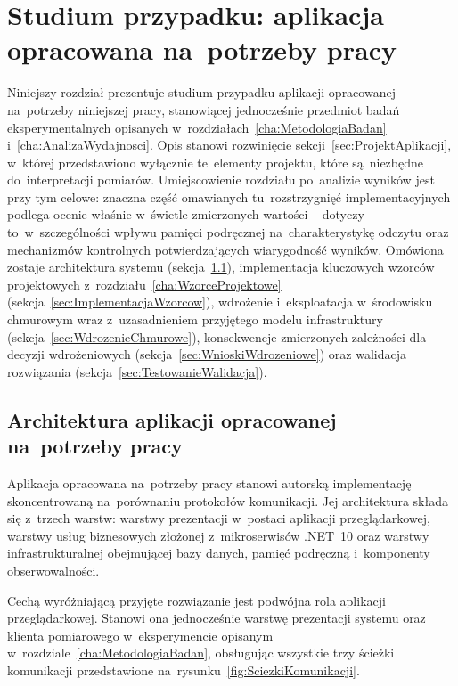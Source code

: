 \cleardoublepage

\chapter{Studium przypadku: aplikacja opracowana na~potrzeby pracy}
\label{cha:StudiumPrzypadku}

Niniejszy rozdział prezentuje studium przypadku aplikacji opracowanej na~potrzeby niniejszej pracy, stanowiącej jednocześnie przedmiot badań eksperymentalnych opisanych w~rozdziałach~\ref{cha:MetodologiaBadan} i~\ref{cha:AnalizaWydajnosci}. Opis stanowi rozwinięcie sekcji~\ref{sec:ProjektAplikacji}, w~której przedstawiono wyłącznie te~elementy projektu, które są~niezbędne do~interpretacji pomiarów. Umiejscowienie rozdziału po~analizie wyników jest przy tym celowe: znaczna część omawianych tu~rozstrzygnięć implementacyjnych podlega ocenie właśnie w~świetle zmierzonych wartości -- dotyczy to~w~szczególności wpływu pamięci podręcznej na~charakterystykę odczytu oraz mechanizmów kontrolnych potwierdzających wiarygodność wyników. Omówiona zostaje architektura systemu (sekcja~\ref{sec:ArchitekturaSystemu}), implementacja kluczowych wzorców projektowych z~rozdziału~\ref{cha:WzorceProjektowe} (sekcja~\ref{sec:ImplementacjaWzorcow}), wdrożenie i~eksploatacja w~środowisku chmurowym wraz z~uzasadnieniem przyjętego modelu infrastruktury (sekcja~\ref{sec:WdrozenieChmurowe}), konsekwencje zmierzonych zależności dla decyzji wdrożeniowych (sekcja~\ref{sec:WnioskiWdrozeniowe}) oraz walidacja rozwiązania (sekcja~\ref{sec:TestowanieWalidacja}).

\section{Architektura aplikacji opracowanej na~potrzeby pracy}
\label{sec:ArchitekturaSystemu}

Aplikacja opracowana na~potrzeby pracy stanowi autorską implementację skoncentrowaną na~porównaniu protokołów komunikacji. Jej architektura składa się z~trzech warstw: warstwy prezentacji w~postaci aplikacji przeglądarkowej, warstwy usług biznesowych złożonej z~mikroserwisów .NET~10 oraz warstwy infrastrukturalnej obejmującej bazy danych, pamięć podręczną i~komponenty obserwowalności.

Cechą wyróżniającą przyjęte rozwiązanie jest podwójna rola aplikacji przeglądarkowej. Stanowi ona jednocześnie warstwę prezentacji systemu oraz klienta pomiarowego w~eksperymencie opisanym w~rozdziale~\ref{cha:MetodologiaBadan}, obsługując wszystkie trzy ścieżki komunikacji przedstawione na~rysunku~\ref{fig:SciezkiKomunikacji}.


